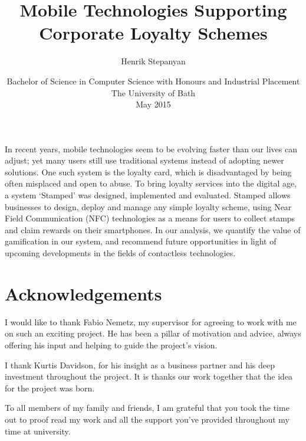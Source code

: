 \documentclass[11pt,openright,a4paper]{report}
\title{Mobile Technologies Supporting Corporate Loyalty Schemes}
\author{Henrik Stepanyan}
\date{Bachelor of Science in Computer Science with Honours and Industrial
Placement\\The University of Bath\\May 2015}
\begin{document}
\lstset{language=Java,breaklines,breakatwhitespace,basicstyle=\small}


\setcounter{page}{0}


\maketitle
\newpage


\newpage


\newpage


\abstract
In recent years, mobile technologies seem to be evolving faster than our lives can adjust; yet many users still use traditional systems instead of adopting newer solutions. One such system is the loyalty card, which is disadvantaged by being often misplaced and open to abuse. To bring loyalty services into the digital age, a system `Stamped' was designed, implemented and evaluated. Stamped allows businesses to design, deploy and manage any simple loyalty scheme, using Near Field Communication (NFC) technologies as a means for users to collect stamps and claim rewards on their smartphones. In our analysis, we quantify the value of gamification in our system, and recommend future opportunities in light of upcoming developments in the fields of contactless technologies. 
\newpage


\tableofcontents
\listoffigures
\listoftables
\newpage

\chapter*{Acknowledgements}
I would like to thank Fabio Nemetz, my supervisor for agreeing to work with me
on such an exciting project. He has been a pillar of motivation and advice,
always offering his input and helping to guide the project's vision.

I thank Kurtis Davidson, for his insight as a business partner and his deep
investment throughout the project. It is thanks our work together that the idea
for the project was born.

To all members of my family and friends, I am grateful that you took the time 
out to proof read my work and all the support you've provided throughout
my time at university.
\end{document}
